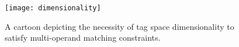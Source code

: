 \begin{figure}
\begin{center}

\texttt{[image: dimensionality]}
\caption{
A cartoon depicting the necessity of tag space dimensionality to satisfy multi-operand matching constraints.
}
\label{fig:dimensionality}

\end{center}
\end{figure}
